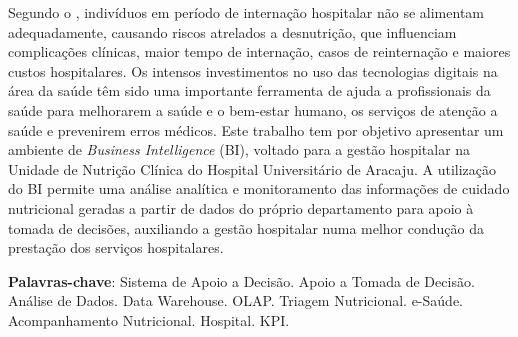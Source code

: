 \setlength{\absparsep}{18pt} %
\begin{resumo}
 
Segundo o , indivíduos em período de internação hospitalar não se alimentam adequadamente, causando riscos atrelados a desnutrição, que influenciam complicações clínicas, maior tempo de internação, casos de reinternação e maiores custos hospitalares. Os intensos investimentos no uso das tecnologias digitais na área da saúde têm sido uma importante ferramenta de ajuda a profissionais da saúde para melhorarem a saúde e o bem-estar humano, os serviços de atenção a saúde e prevenirem erros médicos. Este trabalho tem por objetivo apresentar um ambiente de \textit{Business Intelligence} (BI), voltado para a gestão hospitalar na Unidade de Nutrição Clínica do Hospital Universitário de Aracaju. A utilização do BI permite uma análise analítica e monitoramento das informações de cuidado nutricional geradas a partir de dados do próprio departamento para apoio à tomada de decisões, auxiliando a gestão hospitalar numa melhor condução da prestação dos serviços hospitalares. 

 \textbf{Palavras-chave}: Sistema de Apoio a Decisão. Apoio a Tomada de Decisão. Análise de Dados. Data Warehouse. OLAP. Triagem Nutricional. e-Saúde. Acompanhamento Nutricional. Hospital. KPI.
\end{resumo}